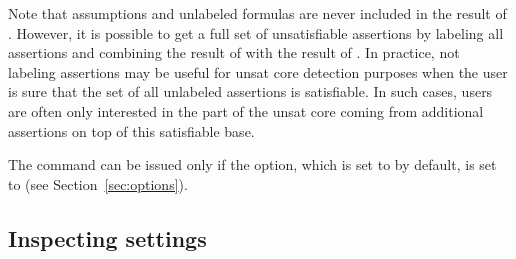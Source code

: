 \begin{description}
Note that assumptions and unlabeled formulas are never included in the result
of .  However, it is possible to get a full set
of unsatisfiable assertions by labeling all assertions and combining the result
of  with the result of .
In practice, not labeling
assertions may be useful for unsat core detection purposes when the
user is sure that the set of all unlabeled assertions is satisfiable.  In such
cases, users are often only interested in the part of the unsat core coming
from additional assertions on top of this satisfiable base.
%



The command can be issued only if the  option,
which is set to  by default, is set to  
(see Section~\ref{sec:options}).

\end{description}


\subsection{Inspecting settings}

